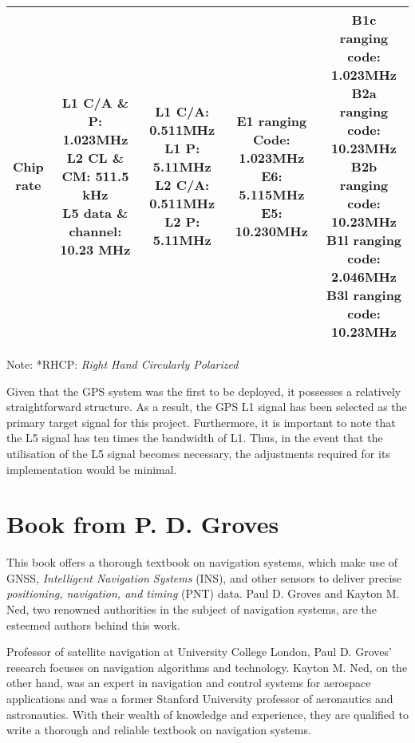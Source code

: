 \begin{landscape}
\begin{center}
\begin{table}
\begin{tabular}{ccccc}
    \thead{Chip\\rate} & \thead{L1 C/A \& P: 1.023MHz\\L2 CL \& CM: 511.5 kHz\\L5 data \& channel: 10.23 MHz} & \thead{L1 C/A: 0.511MHz\\L1 P: 5.11MHz\\L2 C/A: 0.511MHz\\L2 P: 5.11MHz} & \thead{E1 ranging Code: 1.023MHz\\E6: 5.115MHz\\E5: 10.230MHz} & \thead{B1c ranging code: 1.023MHz\\B2a ranging code: 10.23MHz\\B2b ranging code: 10.23MHz\\B1l ranging code: 2.046MHz\\B3l ranging code: 10.23MHz}\\
    \bottomrule
    \end{tabular}
    \footnotesize Note: *RHCP: \textit{Right Hand Circularly Polarized}
\end{table}
\end{center}
\end{landscape}
Given that the GPS system was the first to be deployed, it possesses a relatively straightforward structure. As a result, the GPS L1 signal has been selected as the primary target signal for this project. Furthermore, it is important to note that the L5 signal has ten times the bandwidth of L1. Thus, in the event that the utilisation of the L5 signal becomes necessary, the adjustments required for its implementation would be minimal.

\section{Book from P. D. Groves\texorpdfstring{\cite{RN178}}{}}
This book offers a thorough textbook on navigation systems, which make use of GNSS, \textit{Intelligent Navigation Systems} (INS), and other sensors to deliver precise \textit{positioning, navigation, and timing} (PNT) data. Paul D. Groves and Kayton M. Ned, two renowned authorities in the subject of navigation systems, are the esteemed authors behind this work.

Professor of satellite navigation at University College London, Paul D. Groves' research focuses on navigation algorithms and technology. Kayton M. Ned, on the other hand, was an expert in navigation and control systems for aerospace applications and was a former Stanford University professor of aeronautics and astronautics. With their wealth of knowledge and experience, they are qualified to write a thorough and reliable textbook on navigation systems.

